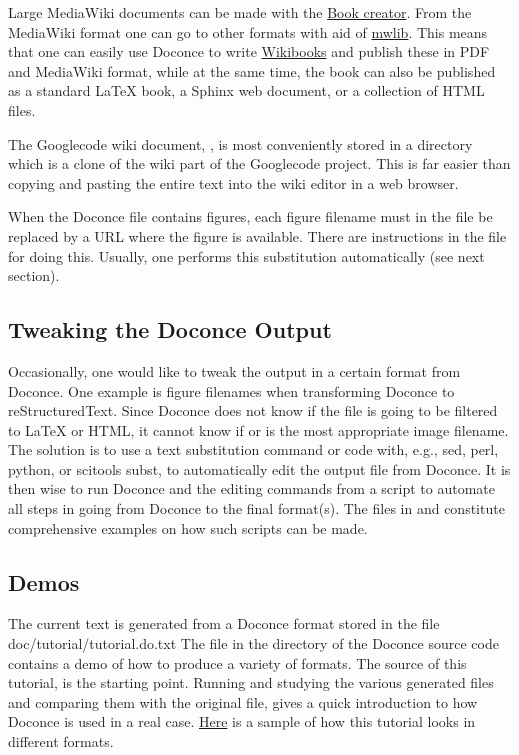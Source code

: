 \documentclass[%
oneside,                 %
final,                   %
10pt]{article}
\begin{document}
Large MediaWiki documents can be made with the
\href{{http://en.wikipedia.org/w/index.php?title=Special:Book&bookcmd=book_creator}}{Book creator}.
From the MediaWiki format one can go to other formats with aid
of \href{{http://pediapress.com/code/}}{mwlib}. This means that one can
easily use Doconce to write \href{{http://en.wikibooks.org}}{Wikibooks}
and publish these in PDF and MediaWiki format, while
at the same time, the book can also be published as a
standard {\LaTeX} book, a Sphinx web document, or a collection of HTML files.



The Googlecode wiki document, , is most conveniently stored
in a directory which is a clone of the wiki part of the Googlecode project.
This is far easier than copying and pasting the entire text into the
wiki editor in a web browser.

When the Doconce file contains figures, each figure filename must in
the  file be replaced by a URL where the figure is
available. There are instructions in the file for doing this. Usually,
one performs this substitution automatically (see next section).

\subsection{Tweaking the Doconce Output}

Occasionally, one would like to tweak the output in a certain format
from Doconce. One example is figure filenames when transforming
Doconce to reStructuredText. Since Doconce does not know if the
 file is going to be filtered to {\LaTeX} or HTML, it cannot know
if  or  is the most appropriate image filename.
The solution is to use a text substitution command or code with, e.g., sed,
perl, python, or scitools subst, to automatically edit the output file
from Doconce. It is then wise to run Doconce and the editing commands
from a script to automate all steps in going from Doconce to the final
format(s). The  files in  and 
constitute comprehensive examples on how such scripts can be made.


\subsection{Demos}

The current text is generated from a Doconce format stored in the file
\bccq
doc/tutorial/tutorial.do.txt
\eccq
The file  in the  directory of the
Doconce source code contains a demo of how to produce a variety of
formats.  The source of this tutorial,  is the
starting point.  Running  and studying the various generated
files and comparing them with the original  file,
gives a quick introduction to how Doconce is used in a real case.
\href{{https://doconce.googlecode.com/hg/doc/demos/tutorial/index.html}}{Here}
is a sample of how this tutorial looks in different formats.
\end{document}
